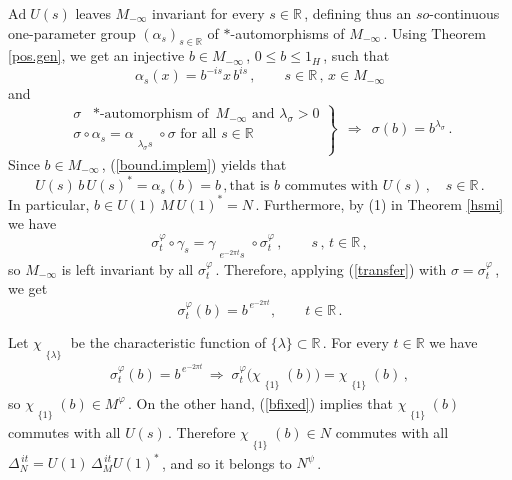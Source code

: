 \documentclass[reqno]{amsart}
\theoremstyle{definition}
\theoremstyle{remark}
\numberwithin{equation}{section}
\theoremstyle{plain}
\begin{document}
$\text{Ad}\; U(s)$ leaves $M_{-\infty}$ invariant for every
$s\in\mathbb R\,$, defining thus an $so$-continuous one-parameter
group $(\alpha_s)_{s\in\mathbb R}$ of $*$-automorphisms of
$M_{-\infty}\,$. Using Theorem \ref{pos.gen}, we get an
injective $b\in M_{-\infty}\,$, $0\leq b\leq 1_H\,$, such that
\begin{equation}\label{bound.implem}
\alpha_s (x) =b^{-is} x\, b^{is}\, ,\qquad s\in\mathbb R\, ,\,
x\in M_{-\infty}
\end{equation}
and
\begin{equation}\label{transfer}
\left. \begin{array}{l} \sigma\text{ $*$-automorphism of }
M_{-\infty}\text{ and }\lambda_\sigma >0 \\
\sigma\circ\alpha_s =\alpha_{\substack{{}\\ {\lambda_\sigma s}}}
\circ\sigma\text{ for all }s\in\mathbb R \end{array} \right\}
\;\,\Longrightarrow\;\,\sigma (b) =b^{\lambda_\sigma}\, .
\end{equation}
\smallskip
\noindent Since $b\in M_{-\infty}\,$, (\ref{bound.implem}) yields
that
\begin{equation}\label{bfixed}
U(s)\, b\, U(s)^*=\alpha_s(b) =b\, ,\text{that is }b
\text{ commutes with }U(s)\, ,\quad s\in\mathbb R\, .
\end{equation}
In particular, $b\in U(1)\, M\, U(1)^* =N\,$. Furthermore, by
(1) in Theorem \ref{hsmi} we have
\begin{equation}\label{sigma-gamma}
\sigma^\varphi_t\circ\gamma_s =
\gamma_{\substack{{}\\ {e^{-2\pi t} s}}}\circ
\sigma^\varphi_t\, ,\qquad s\, ,\, t\in\mathbb R\, ,
\end{equation}
so $M_{-\infty}$ is left invariant by all $\sigma^\varphi_t\,$.
Therefore, applying (\ref{transfer}) with
$\sigma =\sigma^\varphi_t\,$, we get
\begin{equation}\label{mappingb}
\sigma^\varphi_t (b) =b^{\, e^{-2\pi t}} ,\qquad t\in
\mathbb R\, .
\end{equation}

Let $\chi_{\substack{{}\\{\{ \lambda\}}}}$ be the characteristic
function of $\{ \lambda\}\subset\mathbb R\,$. For every $t\in
\mathbb R$ we have
\begin{equation*}
\sigma^\varphi_t (b) =b^{\, e^{-2\pi t}}\,\Longrightarrow\;
\sigma^\varphi_t \big(\chi_{\substack{{}\\{\{ 1\}}}} (b)\big)
=\chi_{\substack{{}\\{\{ 1\}}}} (b)\, ,
\end{equation*}
so $\chi_{\substack{{}\\{\{ 1\}}}} (b)\in M^\varphi\,$.
On the other hand, (\ref{bfixed}) implies that
$\chi_{\substack{{}\\{\{ 1\}}}} (b)$ commutes with all $U(s)\,$.
Therefore $\chi_{\substack{{}\\{\{ 1\}}}} (b)\in N$ commutes
with all $\Delta_N^{\, it} = U(1)\,\Delta_M^{\, it} U(1)^*\,$,
and so it belongs to $N^\psi\,$.
\end{document}
